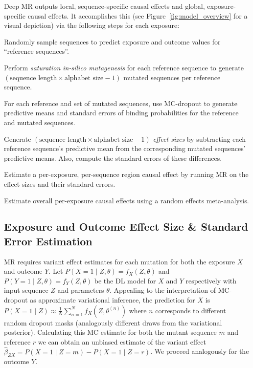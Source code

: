 \documentclass{article}
\begin{document}
Deep MR outputs local, sequence-specific causal effects and global, exposure-specific causal effects. It accomplishes this (see Figure~\ref{fig:model_overview} for a visual depiction) via the following steps for each exposure:
\begin{compactenum}
    \item Randomly sample sequences to predict exposure and outcome values for ``reference sequences''.
    \item Perform \textit{saturation in-silico mutagenesis} for each reference sequence to generate \( (\text{sequence\ length} \times \text{alphabet\ size} - 1) \) mutated sequences per reference sequence.
    \item For each reference and set of mutated sequences, use MC-dropout \cite{gal2016dropout} to generate predictive means and standard errors of binding probabilities for the reference and mutated sequences.
    \item Generate \( (\text{sequence length} \times \text{alphabet size} - 1) \) \textit{effect sizes} by subtracting each reference sequence's predictive mean from the corresponding mutated sequences' predictive means. Also, compute the standard errors of these differences.
    \item Estimate a per-exposure, per-sequence region causal effect by running MR on the effect sizes and their standard errors.
    \item Estimate overall per-exposure causal effects using a random effects meta-analysis.
\end{compactenum}


\subsection{Exposure and Outcome Effect Size \& Standard Error Estimation}

MR requires variant effect estimates for each mutation for both the exposure $X$ and outcome $Y$. Let $P(X=1 \mid Z, \theta) = f_X(Z,\theta)$ and $P(Y=1 \mid Z, \theta) = f_Y(Z,\theta)$ be the DL model for $X$ and $Y$ respectively with input sequence $Z$ and parameters $\theta$. Appealing to the interpretation of MC-dropout as approximate variational inference, the prediction for $X$ is $P(X=1 \mid Z) \approx \frac1N \sum_{n=1}^N f_X(Z, \theta^{(n)})$ where $n$ corresponds to different random dropout masks (analogously different draws from the variational posterior). Calculating this MC estimate for both the mutant sequence $m$ and reference $r$ we can obtain an unbiased estimate of the variant effect $\hat{\beta}_{ZX} = P(X=1 \mid Z=m) - P(X=1 \mid Z=r)$. We proceed analogously for the outcome $Y$.
\end{document}
